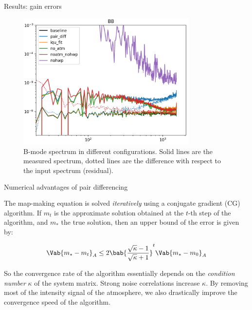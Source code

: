 \documentclass[final]{beamer}
\newlength{\colwidth}
\begin{document}
\begin{frame}[t]
\begin{columns}[t]
\begin{column}{\colwidth}
      \begin{block}{Results: gain errors}

        \begin{figure}
          \centering
          \includegraphics[width=0.8\textwidth]{figures/comparison_bb.png}
          \caption{B-mode spectrum in different configurations. Solid lines are the measured spectrum, dotted lines are the difference with respect to the input spectrum (residual).}
        \end{figure}
      \end{block}

      \begin{exampleblock}{Numerical advantages of pair differencing}

        The map-making equation is solved \emph{iteratively} using a conjugate gradient (CG) algorithm.
        If $m_t$ is the approximate solution obtained at the $t$-th step of the algorithm, and $m_\ast$ the true solution, then an upper bound of the error is given by:

        \begin{equation}
          \Vab{m_\ast - m_t}_A \leq 2 \bab{\frac{\sqrt{\kappa} - 1}{\sqrt{\kappa} + 1}}^t \Vab{m_\ast - m_0}_A
        \end{equation}

        So the convergence rate of the algorithm essentially depends on the \emph{condition number} $\kappa$ of the system matrix.
        Strong noise correlations increase $\kappa$. By removing most of the intensity signal of the atmosphere, we also drastically improve the convergence speed of the algorithm.


\end{exampleblock}
\end{column}
\end{columns}
\end{frame}
\end{document}
